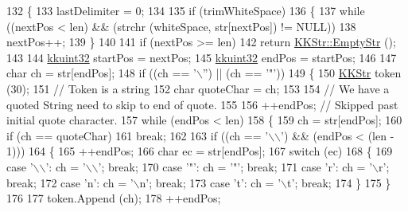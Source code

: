 \begin{DoxyCode}
132 \{
133   lastDelimiter = 0;
134 
135   \textcolor{keywordflow}{if}  (trimWhiteSpace)
136   \{
137     \textcolor{keywordflow}{while}  ((nextPos < len)  &&  (strchr (whiteSpace, str[nextPos]) != NULL))
138       nextPos++;
139   \}
140 
141   \textcolor{keywordflow}{if} (nextPos >= len)
142     \textcolor{keywordflow}{return} \hyperlink{class_k_k_b_1_1_k_k_str_ab6e416b3ef54ef632bd10c3f7a2f7994}{KKStr::EmptyStr} ();
143 
144   \hyperlink{namespace_k_k_b_af8d832f05c54994a1cce25bd5743e19a}{kkuint32}  startPos = nextPos;
145   \hyperlink{namespace_k_k_b_af8d832f05c54994a1cce25bd5743e19a}{kkuint32}  endPos   = startPos;
146 
147   \textcolor{keywordtype}{char} ch = str[endPos];
148   \textcolor{keywordflow}{if}  ((ch == \textcolor{charliteral}{'\(\backslash\)''})  ||  (ch == \textcolor{charliteral}{'"'}))
149   \{
150     \hyperlink{class_k_k_b_1_1_k_k_str}{KKStr}  token (30);
151     \textcolor{comment}{// Token is a string}
152     \textcolor{keywordtype}{char}  quoteChar = ch;
153 
154     \textcolor{comment}{// We have a quoted String need to skip to end of quote.}
155 
156     ++endPos;  \textcolor{comment}{// Skipped past initial quote character.}
157     \textcolor{keywordflow}{while}  (endPos < len)
158     \{
159       ch = str[endPos];
160       \textcolor{keywordflow}{if}  (ch == quoteChar)
161         \textcolor{keywordflow}{break};
162 
163       \textcolor{keywordflow}{if}  ((ch == \textcolor{charliteral}{'\(\backslash\)\(\backslash\)'})  &&  (endPos < (len - 1)))
164       \{
165         ++endPos;
166         \textcolor{keywordtype}{char}  ec = str[endPos];
167         \textcolor{keywordflow}{switch}  (ec)
168         \{
169         \textcolor{keywordflow}{case} \textcolor{charliteral}{'\(\backslash\)\(\backslash\)'}:  ch = \textcolor{charliteral}{'\(\backslash\)\(\backslash\)'};  \textcolor{keywordflow}{break};
170         \textcolor{keywordflow}{case}  \textcolor{charliteral}{'"'}:  ch = \textcolor{charliteral}{'"'};  \textcolor{keywordflow}{break};
171         \textcolor{keywordflow}{case}  \textcolor{charliteral}{'r'}:  ch = \textcolor{charliteral}{'\(\backslash\)r'};  \textcolor{keywordflow}{break};
172         \textcolor{keywordflow}{case}  \textcolor{charliteral}{'n'}:  ch = \textcolor{charliteral}{'\(\backslash\)n'};  \textcolor{keywordflow}{break};
173         \textcolor{keywordflow}{case}  \textcolor{charliteral}{'t'}:  ch = \textcolor{charliteral}{'\(\backslash\)t'};  \textcolor{keywordflow}{break};
174         \}
175       \}
176 
177       token.Append (ch);
178       ++endPos;

\end{DoxyCode}
